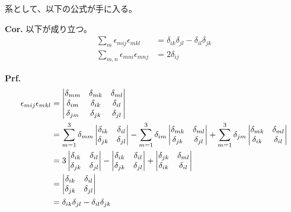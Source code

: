\documentclass[a4paper,11pt]{jsarticle}
\numberwithin{equation}{section}
\begin{document}
系として、以下の公式が手に入る。
\begin{itembox}[l]{\textbf{Cor.}}
  以下が成り立つ。
  \begin{align}
    \sum_{m} \epsilon_{mij}\epsilon_{mkl} &= \delta_{ik}\delta_{jl} - \delta_{il}\delta_{jk}\\
    \sum_{m,n} \epsilon_{mni}\epsilon_{mnj} &= 2\delta_{ij} 
  \end{align}

\end{itembox}
\textbf{Prf.}\\
\begin{align}
  \epsilon_{mij} \epsilon_{mkl} 
  &=
  \begin{vmatrix}
  \delta_{mm} & \delta_{mk} & \delta_{ml} \\
  \delta_{im} & \delta_{ik} & \delta_{il} \\
  \delta_{jm} & \delta_{jk} & \delta_{jl}
  \end{vmatrix} \notag \\
  &= \sum_{m=1}^{3} \delta_{mm}
  \begin{vmatrix}
  \delta_{ik} & \delta_{il} \\
  \delta_{jk} & \delta_{jl}
  \end{vmatrix}
  - \sum_{m=1}^{3} \delta_{im}
  \begin{vmatrix}
  \delta_{mk} & \delta_{ml} \\
  \delta_{jk} & \delta_{jl}
  \end{vmatrix}
  + \sum_{m=1}^{3} \delta_{jm}
  \begin{vmatrix}
  \delta_{mk} & \delta_{ml} \\
  \delta_{ik} & \delta_{il}
  \end{vmatrix} \notag \\
  &= 3
  \begin{vmatrix}
  \delta_{ik} & \delta_{il} \\
  \delta_{jk} & \delta_{jl}
  \end{vmatrix}
  - 
  \begin{vmatrix}
  \delta_{ik} & \delta_{il} \\
  \delta_{jk} & \delta_{jl}
  \end{vmatrix}
  +
  \begin{vmatrix}
  \delta_{jk} & \delta_{ml} \\
  \delta_{ik} & \delta_{il}
  \end{vmatrix} \notag \\
  &=
  \begin{vmatrix}
  \delta_{ik} & \delta_{il} \\
  \delta_{jk} & \delta_{jl}
  \end{vmatrix} \notag \\
  &= \delta_{ik} \delta_{jl} - \delta_{il} \delta_{jk}
  \end{align}
  
\end{document}

